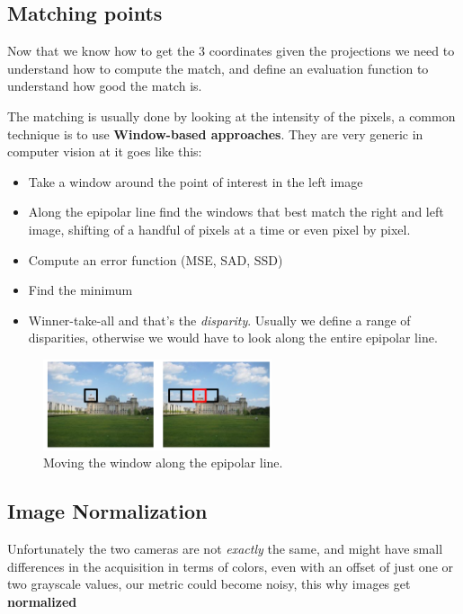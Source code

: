 \subsection{Matching points}

Now that we know how to get the 3 coordinates given the projections we need to understand how to compute the match, and define an evaluation function to understand how good the match is. 

The matching is usually done by looking at the intensity of the pixels, a common technique is to use \textbf{Window-based approaches}. They are very generic in computer vision at it goes like this:

\begin{itemize}
    \item Take a window around the point of interest in the left image
    \item Along the epipolar line find the windows that best match the right and left image, shifting of a handful of pixels at a time or even pixel by pixel.
    \item Compute an error function (MSE, SAD, SSD)
    \item Find the minimum
    \item Winner-take-all and that's the \textit{disparity}. Usually we define a range of disparities, otherwise we would have to look along the entire epipolar line.
\end{itemize}

\begin{figure}[H]
    \centering
    \includegraphics[width=0.6\textwidth]{Figures/sad.png}
    \caption{Moving the window along the epipolar line.}
    \label{fig:sad}
\end{figure}



\subsection{Image Normalization}

Unfortunately the two cameras are not \textit{exactly} the same, and might have small differences in the acquisition in terms of colors, even with an offset of just one or two grayscale values, our metric could become noisy, this why images get \textbf{normalized}


